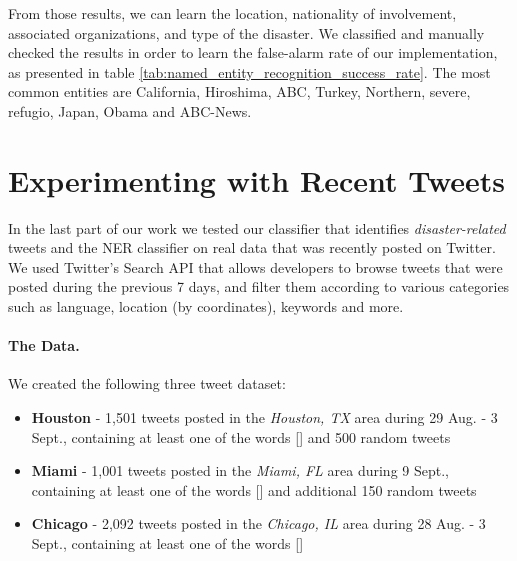\documentclass[letterpaper,twocolumn,10pt]{article}
\begin{document}
From those results, we can learn the location, nationality of involvement, associated organizations, and type of the disaster. We classified and manually checked the results in order to learn the false-alarm rate of our implementation, as presented in table 
 \ref{tab:named_entity_recognition_success_rate}. The most common entities are California, Hiroshima, ABC, Turkey, Northern, severe, refugio, Japan, Obama and ABC-News.

\begin{table}[H]
	\begin{center}
	\end{center}
	\caption{Named Entity Recognition Success Rate}
	\label{tab:named_entity_recognition_success_rate}
\end{table}


\section{Experimenting with Recent Tweets} \label{recent-tweets-results}

In the last part of our work we tested our classifier that identifies \textit{disaster-related} tweets and the NER classifier on real data that was recently posted on Twitter. We used Twitter's Search API that allows developers to browse tweets that were posted during the previous 7 days, and filter them according to various categories such as language, location (by coordinates), keywords and more.

\paragraph{The Data.} We created the following three tweet dataset:

\begin{itemize}[noitemsep, nolistsep]
	\item\textbf{Houston} - 1,501 tweets posted in the \textit{Houston, TX} area during 29 Aug. - 3 Sept., containing at least one of the words [] and 500 random tweets
	\item\textbf{Miami} - 1,001 tweets posted in the \textit{Miami, FL} area during 9 Sept., containing at least one of the words [] and additional 150 random tweets
	\item\textbf{Chicago} - 2,092 tweets posted in the \textit{Chicago, IL} area during 28 Aug. - 3 Sept., containing at least one of the words []
\end{itemize}
\end{document}
